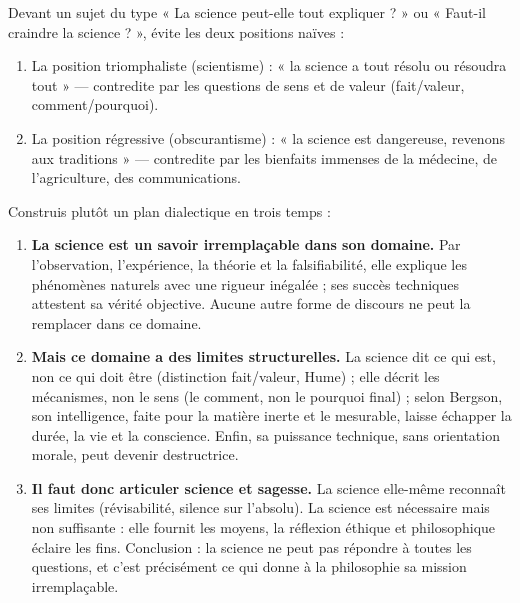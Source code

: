 \documentclass[11pt]{article}
\begin{document}
\begin{methode}
Devant un sujet du type « La science peut-elle tout expliquer ? » ou « Faut-il craindre la science ? », évite les deux positions naïves :
\begin{enumerate}
\item La position triomphaliste (scientisme) : « la science a tout résolu ou résoudra tout » — contredite par les questions de sens et de valeur (fait/valeur, comment/pourquoi).
\item La position régressive (obscurantisme) : « la science est dangereuse, revenons aux traditions » — contredite par les bienfaits immenses de la médecine, de l'agriculture, des communications.
\end{enumerate}
Construis plutôt un plan dialectique en trois temps :
\begin{enumerate}
\item \textbf{La science est un savoir irremplaçable dans son domaine.} Par l'observation, l'expérience, la théorie et la falsifiabilité, elle explique les phénomènes naturels avec une rigueur inégalée ; ses succès techniques attestent sa vérité objective. Aucune autre forme de discours ne peut la remplacer dans ce domaine.
\item \textbf{Mais ce domaine a des limites structurelles.} La science dit ce qui est, non ce qui doit être (distinction fait/valeur, Hume) ; elle décrit les mécanismes, non le sens (le comment, non le pourquoi final) ; selon Bergson, son intelligence, faite pour la matière inerte et le mesurable, laisse échapper la durée, la vie et la conscience. Enfin, sa puissance technique, sans orientation morale, peut devenir destructrice.
\item \textbf{Il faut donc articuler science et sagesse.} La science elle-même reconnaît ses limites (révisabilité, silence sur l'absolu). La science est nécessaire mais non suffisante : elle fournit les moyens, la réflexion éthique et philosophique éclaire les fins. Conclusion : la science ne peut pas répondre à toutes les questions, et c'est précisément ce qui donne à la philosophie sa mission irremplaçable.
\end{enumerate}
\end{methode}
\end{document}
